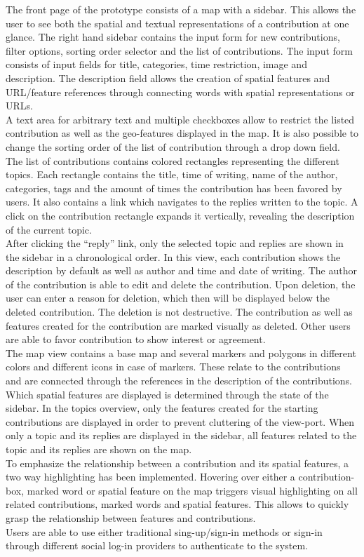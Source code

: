 \documentclass{sigchi}
\begin{document}
The front page of the prototype consists of a map with a sidebar. This allows the user to see both the spatial and textual representations of a contribution at one glance. The right hand sidebar contains the input form for new contributions, filter options, sorting order selector and the list of contributions. The input form consists of input fields for title, categories, time restriction, image and description. The description field allows the creation of spatial features and URL/feature references through connecting words with spatial representations or URLs.\\
A text area for arbitrary text and multiple checkboxes allow to restrict the listed contribution as well as the geo-features displayed in the map. It is also possible to change the sorting order of the list of contribution through a drop down field.\\
The list of contributions contains colored rectangles representing the different topics. Each rectangle contains the title, time of writing, name of the author, categories, tags and the amount of times the contribution has been favored by users. It also contains a link which navigates to the replies written to the topic. A click on the contribution rectangle expands it vertically, revealing the description of the current topic.\\
After clicking the ``reply'' link, only the selected topic and replies are shown in the sidebar in a chronological order. In this view, each contribution shows the description by default as well as author and time and date of writing. The author of the contribution is able to edit and delete the contribution. Upon deletion, the user can enter a reason for deletion, which then will be displayed below the deleted contribution. The deletion is not destructive. The contribution as well as features created for the contribution are marked visually as deleted. Other users are able to favor contribution to show interest or agreement.\\
The map view contains a base map and several markers and polygons in different colors and different icons in case of markers. These relate to the contributions and are connected through the references in the description of the contributions. Which spatial features are displayed is determined through the state of the sidebar. In the topics overview, only the features created for the starting contributions are displayed in order to prevent cluttering of the view-port. When only a topic and its replies are displayed in the sidebar, all features related to the topic and its replies are shown on the map.\\
To emphasize the relationship between a contribution and its spatial features, a two way highlighting has been implemented. Hovering over either a contribution-box, marked word or spatial feature on the map triggers visual highlighting on all related contributions, marked words and spatial features. This allows to quickly grasp the relationship between features and contributions.\\
Users are able to use either traditional sing-up/sign-in methods or sign-in through different social log-in providers to authenticate to the system.
\end{document}

